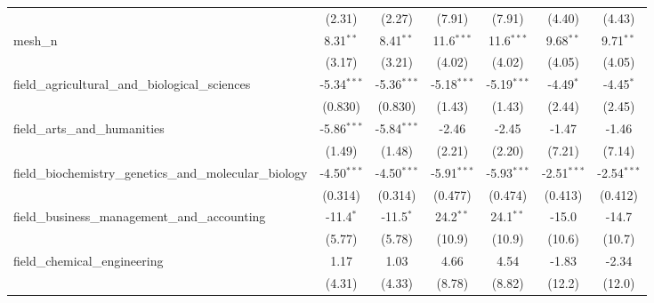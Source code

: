 \begin{tabular}{lcccccc}
                                                               & (2.31)         & (2.27)         & (7.91)        & (7.91)        & (4.40)        & (4.43)\\   
   mesh\_n                                                     & 8.31$^{**}$    & 8.41$^{**}$    & 11.6$^{***}$  & 11.6$^{***}$  & 9.68$^{**}$   & 9.71$^{**}$\\   
                                                               & (3.17)         & (3.21)         & (4.02)        & (4.02)        & (4.05)        & (4.05)\\   
   field\_agricultural\_and\_biological\_sciences              & -5.34$^{***}$  & -5.36$^{***}$  & -5.18$^{***}$ & -5.19$^{***}$ & -4.49$^{*}$   & -4.45$^{*}$\\   
                                                               & (0.830)        & (0.830)        & (1.43)        & (1.43)        & (2.44)        & (2.45)\\   
   field\_arts\_and\_humanities                                & -5.86$^{***}$  & -5.84$^{***}$  & -2.46         & -2.45         & -1.47         & -1.46\\   
                                                               & (1.49)         & (1.48)         & (2.21)        & (2.20)        & (7.21)        & (7.14)\\   
   field\_biochemistry\_genetics\_and\_molecular\_biology      & -4.50$^{***}$  & -4.50$^{***}$  & -5.91$^{***}$ & -5.93$^{***}$ & -2.51$^{***}$ & -2.54$^{***}$\\   
                                                               & (0.314)        & (0.314)        & (0.477)       & (0.474)       & (0.413)       & (0.412)\\   
   field\_business\_management\_and\_accounting                & -11.4$^{*}$    & -11.5$^{*}$    & 24.2$^{**}$   & 24.1$^{**}$   & -15.0         & -14.7\\   
                                                               & (5.77)         & (5.78)         & (10.9)        & (10.9)        & (10.6)        & (10.7)\\   
   field\_chemical\_engineering                                & 1.17           & 1.03           & 4.66          & 4.54          & -1.83         & -2.34\\   
                                                               & (4.31)         & (4.33)         & (8.78)        & (8.82)        & (12.2)        & (12.0)\\   

\end{tabular}
